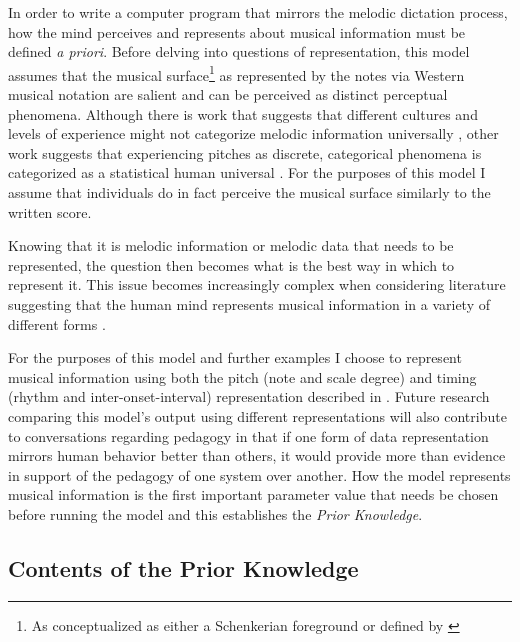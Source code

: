 \documentclass[]{book}
\let\rmarkdownfootnote\footnote%
\def\footnote{\protect\rmarkdownfootnote}
\theoremstyle{definition}
\theoremstyle{definition}
\theoremstyle{definition}
\theoremstyle{remark}
\begin{document}
In order to write a computer program that mirrors the melodic dictation
process, how the mind perceives and represents about musical information
must be defined \emph{a priori}. Before delving into questions of
representation, this model assumes that the musical surface\footnote{As
  conceptualized as either a Schenkerian foreground
  \citep{schenkerFreieSatz1935} or defined by
  \citet{lerdahlGenerativeTheoryTonal1986}} as represented by the notes
via Western musical notation are salient and can be perceived as
distinct perceptual phenomena. Although there is work that suggests that
different cultures and levels of experience might not categorize melodic
information universally
\citep{mcdermottIndifferenceDissonanceNative2016}, other work suggests
that experiencing pitches as discrete, categorical phenomena is
categorized as a statistical human universal
\citep{savageStatisticalUniversalsReveal2015}. For the purposes of this
model I assume that individuals do in fact perceive the musical surface
similarly to the written score.

Knowing that it is melodic information or melodic data that needs to be
represented, the question then becomes what is the best way in which to
represent it. This issue becomes increasingly complex when considering
literature suggesting that the human mind represents musical information
in a variety of different forms
\citep{krumhanslCognitiveFoundationsMusical2001, levitinCurrentAdvancesCognitive2009}.

For the purposes of this model and further examples I choose to
represent musical information using both the pitch (note and scale
degree) and timing (rhythm and inter-onset-interval) representation
described in \citet{pearceStatisticalLearningProbabilistic2018a}. Future
research comparing this model's output using different representations
will also contribute to conversations regarding pedagogy in that if one
form of data representation mirrors human behavior better than others,
it would provide more than evidence in support of the pedagogy of one
system over another. How the model represents musical information is the
first important parameter value that needs be chosen before running the
model and this establishes the \emph{Prior Knowledge}.

\hypertarget{contents-of-the-prior-knowledge}{%
\subsection{Contents of the Prior
Knowledge}\label{contents-of-the-prior-knowledge}}
\end{document}
